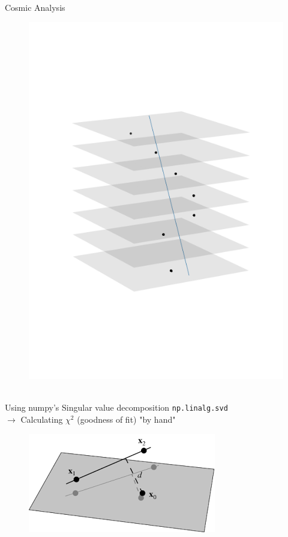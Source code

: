\documentclass{beamer}
\begin{document}
\begin{frame}[fragile]{Cosmic Analysis}
\begin{minipage}{.32\textwidth}
\begin{figure}[H]
	    \includegraphics[trim=0 80 0 80,clip,width=\textwidth]{example_290252.png}
	\end{figure}
    \end{minipage}\\
    Using numpy's Singular value decomposition \verb]np.linalg.svd] \\[.1cm]
    \( \rightarrow \) Calculating \( \chi ^2 \) (goodness of fit) "by hand" \\
    \begin{minipage}{.4\textwidth}
	\begin{figure}[H]
	    \centering
	    \includegraphics[width=\textwidth]{pointin3d.png}

\end{figure}
\end{minipage}
\end{frame}
\end{document}
